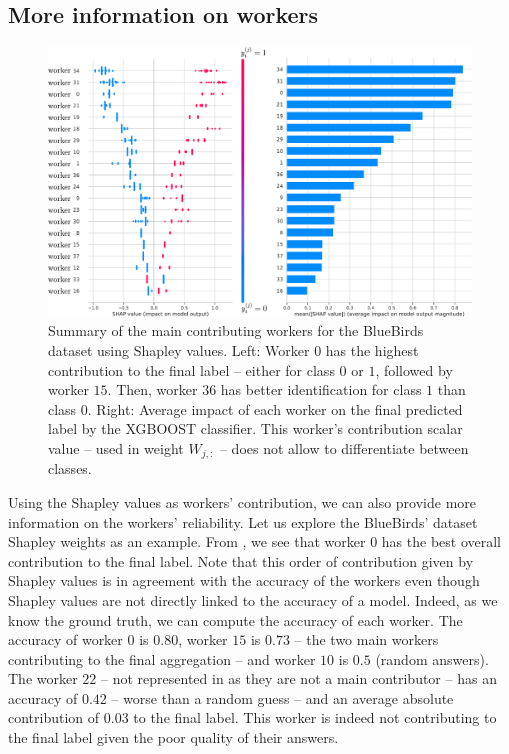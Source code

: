 \documentclass{cap2024}
\begin{document}
\subsection{More information on workers}

\begin{figure}[htb]
  \centering
  \includegraphics[width=.9\textwidth]{./../summary_plot_shap_all_bluebirds.pdf}
  \caption{Summary of the main contributing workers for the BlueBirds dataset using Shapley values. Left: Worker $0$ has the highest contribution to the final label -- either for class $0$ or $1$, followed by worker $15$. Then, worker $36$ has better identification for class $1$ than class $0$. Right: Average impact of each worker on the final predicted label by the XGBOOST classifier. This worker's contribution scalar value -- used in  weight $W_{j,:}$ -- does not allow to differentiate between classes.}
  \label{fig:shap_bluebirds}
\end{figure}

Using the Shapley values as workers' contribution, we can also provide more information on the workers' reliability.
Let us explore the BlueBirds' dataset Shapley weights as an example.
From , we see that worker $0$ has the best overall contribution to the final label.
Note that this order of contribution given by Shapley values is in agreement with the accuracy of the workers even though Shapley values are not directly linked to the accuracy of a model.
Indeed, as we know the ground truth, we can compute the accuracy of each worker.
The accuracy of worker $0$ is $0.80$, worker $15$ is $0.73$ -- the two main workers contributing to the final aggregation -- and worker $10$ is $0.5$ (random answers).
The worker $22$ -- not represented in  as they are not a main contributor -- has an accuracy of $0.42$ -- worse than a random guess -- and an average absolute contribution of $0.03$ to the final label. This worker is indeed not contributing to the final label given the poor quality of their answers.
\end{document}
